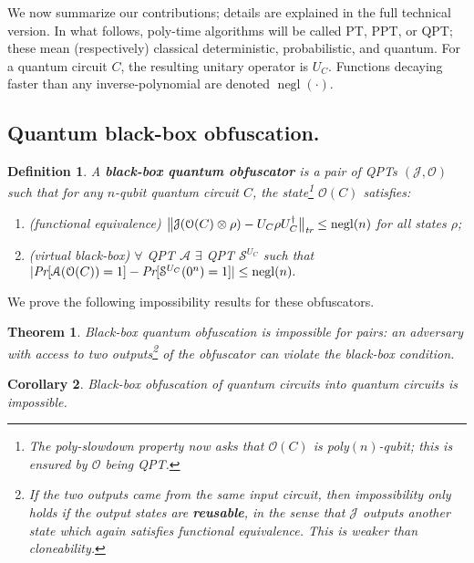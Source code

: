 \documentclass[11pt]{amsart}
\numberwithin{equation}{section}
\newtheorem{theorem}{Theorem}
\newtheorem{corollary}[theorem]{Corollary}
\newtheorem{definition}{Definition}
\newcommand{\opn}{\operatorname}
\newcommand{\algo}{\mathcal}
\newcommand{\negl}{\opn{negl}}
\begin{document}
We now summarize our contributions; details are explained in the full technical version. In what follows, poly-time algorithms will be called PT, PPT, or QPT; these mean (respectively) classical deterministic, probabilistic, and quantum. For a quantum circuit $C$, the resulting unitary operator is $U_C$. Functions decaying faster than any inverse-polynomial are denoted $\negl(\cdot)$.

\subsection{Quantum black-box obfuscation.} 

\begin{definition}\label{def:vbb-obfuscator}
A \textbf{black-box quantum obfuscator} is a pair of QPTs $(\algo J, \algo O)$ such that for any $n$-qubit quantum circuit $C$, the state\footnote{The poly-slowdown property now asks that $\mathcal O(C)$ is poly$(n)$-qubit; this is ensured by $\algo O$ being QPT.} $\mathcal O(C)$ satisfies:
\begin{enumerate}
\item (functional equivalence) $\bigl\| \algo J ( \algo O(C) \otimes \rho ) - U_C \rho U_C^\dagger \bigr\|_\emph{tr} \leq \negl(n)$ for all states $\rho$;
\item (virtual black-box) $\forall$ QPT $\mathcal A$ $\exists$ QPT $\mathcal S^{U_C}$ such that
$| \emph{Pr}[\mathcal A(\mathcal O(C)) = 1] - \emph{Pr}[\mathcal S^{U_C}(0^n) = 1]| \leq \negl(n).$
\end{enumerate}
\end{definition}

\noindent We prove the following impossibility results for these obfuscators.

\begin{theorem}\label{thm:main}
Black-box quantum obfuscation is impossible for pairs: an adversary with access to two outputs\footnote{If the two outputs came from the same input circuit, then impossibility only holds if the output states are \textbf{reusable}, in the sense that $\algo J$ outputs another state which again satisfies functional equivalence. This is weaker than cloneability.} of the obfuscator can violate the black-box condition.
\end{theorem}

\begin{corollary}\label{cor:main}
Black-box obfuscation of quantum circuits into quantum circuits is impossible.
\end{corollary}
\end{document}
